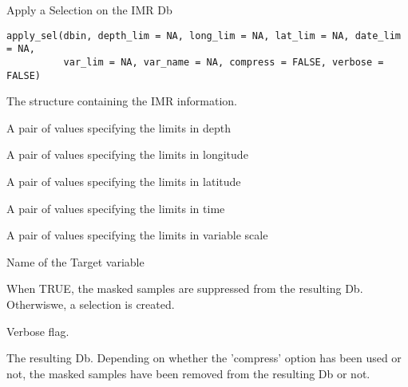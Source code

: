 %
\begin{Description}\relax
Apply a Selection on the IMR Db
\end{Description}
%
\begin{Usage}
\begin{verbatim}
apply_sel(dbin, depth_lim = NA, long_lim = NA, lat_lim = NA, date_lim = NA,
          var_lim = NA, var_name = NA, compress = FALSE, verbose = FALSE)
\end{verbatim}
\end{Usage}
%
\begin{Arguments}
\begin{ldescription}
\item[\code{dbin}] 
The  structure containing the IMR information.

\item[\code{depth\_lim}] 
A pair of values specifying the limits in depth

\item[\code{long\_lim}] 
A pair of values specifying the limits in longitude

\item[\code{lat\_lim}] 
A pair of values specifying the limits in latitude

\item[\code{date\_lim}] 
A pair of values specifying the limits in time

\item[\code{var\_lim}] 
A pair of values specifying the limits in variable scale

\item[\code{var\_name}] 
Name of the Target variable

\item[\code{compress}] 
When TRUE, the masked samples are suppressed from the resulting Db.
Otherwiswe, a selection is created.

\item[\code{verbose}] 
Verbose flag.

\end{ldescription}
\end{Arguments}
%
\begin{Value}
The resulting Db. Depending on whether the 'compress' option has been used or
not, the masked samples have been removed from the resulting Db or not.
\end{Value}
